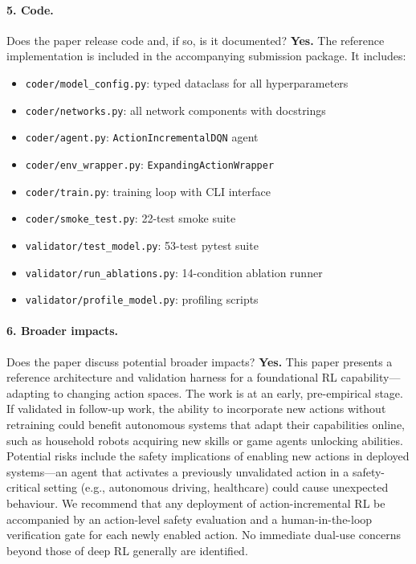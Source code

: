 \documentclass{article}
\begin{document}
\paragraph{5. Code.}
Does the paper release code and, if so, is it documented?
\textbf{Yes.} The reference implementation is included in the accompanying
submission package. It includes:
\begin{itemize}
  \item \texttt{coder/model\_config.py}: typed dataclass for all hyperparameters
  \item \texttt{coder/networks.py}: all network components with docstrings
  \item \texttt{coder/agent.py}: \texttt{ActionIncrementalDQN} agent
  \item \texttt{coder/env\_wrapper.py}: \texttt{ExpandingActionWrapper}
  \item \texttt{coder/train.py}: training loop with CLI interface
  \item \texttt{coder/smoke\_test.py}: 22-test smoke suite
  \item \texttt{validator/test\_model.py}: 53-test pytest suite
  \item \texttt{validator/run\_ablations.py}: 14-condition ablation runner
  \item \texttt{validator/profile\_model.py}: profiling scripts
\end{itemize}

\paragraph{6. Broader impacts.}
Does the paper discuss potential broader impacts?
\textbf{Yes.} This paper presents a reference architecture and validation
harness for a foundational RL capability---adapting to changing action spaces.
The work is at an early, pre-empirical stage. If validated in follow-up work,
the ability to incorporate new actions without retraining could benefit
autonomous systems that adapt their capabilities online, such as household
robots acquiring new skills or game agents unlocking abilities. Potential risks
include the safety implications of enabling new actions in deployed
systems---an agent that activates a previously unvalidated action in a
safety-critical setting (e.g., autonomous driving, healthcare) could cause
unexpected behaviour. We recommend that any deployment of action-incremental
RL be accompanied by an action-level safety evaluation and a human-in-the-loop
verification gate for each newly enabled action. No immediate dual-use
concerns beyond those of deep RL generally are identified.
\end{document}
